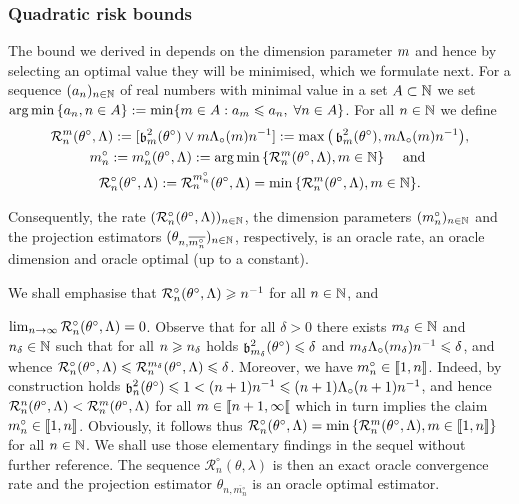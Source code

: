 \subsubsection{Quadratic risk bounds}
The bound we derived in  depends on the
dimension parameter $\Di$ and hence by selecting an optimal value they
will be minimised, which we formulate next.  For a sequence
$\Nsuite[n]{a_n}$ of real numbers with minimal value in a set
$A\subset{\Nz}$ we set
$\argmin\set{a_n,n\in A}:=\min\{m\in A:a_m\leq a_n,\;\forall n\in A
\}$. For all $n\in\Nz$ we define
\begin{multline*}
  \dRa{\Di}{\xdf,\Lambda}:=[\bias^2(\xdf)\vee\Di \oiSv \ssY^{-1}]
  :=\max\vectB{\bias^2(\xdf), \Di \oiSv \ssY^{-1}},\\
  \hfill
  \onDi:=\onDi(\xdf,\Lambda):=\argmin\Nset[{\Di\in\Nz}]{\dRa{\Di}{\xdf,\Lambda}}
  \quad\text{ and }\hfill\\
  \oRa{\xdf,\Lambda}:=\dRa{\onDi}{\xdf,\Lambda}=\min\Nset[{\Di\in\Nz}]{\dRa{\Di}{\xdf,\Lambda}}.
\end{multline*}

\begin{te}
Consequently, the  rate $\Nsuite[\ssY]{\oRa{\xdf,\Lambda}}$, the dimension parameters $\Nsuite[\ssY]{\onDi}$  and  the projection estimators  $\Nsuite[\ssY]{\txdfPr[\onDi]}$, respectively, is an oracle
rate, an oracle dimension and oracle optimal (up to a constant).
\end{te}

\begin{rmk}
We shall emphasise that $\oRa{\xdf,\Lambda}\geq \ssY^{-1}$ for all
  $\ssY\in\Nz$, and
  
  $\lim_{n \rightarrow \infty} \oRa{\xdf,\Lambda}=0$.
  Observe that for all $\delta>0$ there exists $\Di_{\delta}\in\Nz$ and
  $\ssY_\delta\in\Nz$ such that for all $\ssY\geq \ssY_{\delta}$ holds
  $\bias[\Di_\delta]^2(\xdf)\leq \delta$ and
  $\Di_{\delta} \oiSv[\Di_\delta] \ssY^{-1}\leq\delta$, and whence
  $\oRa{\xdf,\Lambda}\leq\dRa{\Di_\delta}{\xdf,\Lambda}\leq \delta$.
  Moreover, we have $\oDi{\ssY}\in\nset{1,\ssY}$. Indeed, by construction
  holds
  $\bias[\ssY]^2(\xdf)\leq 1<(\ssY+1)\ssY^{-1}\leq
  (\ssY+1)\oiSv[\ssY+1]{}\ssY^{-1}$, and hence
  $\dRa{\ssY}{\xdf,\Lambda}<\dRa{\Di}{\xdf,\Lambda}$ for all
  $\Di\in \nsetro{\ssY+1,\infty}$ which in turn implies the claim
  $\oDi{\ssY}\in\nset{1,\ssY}$. Obviously, it follows thus
  $\oRa{\xdf,\Lambda}=\min\set{ \dRa{\Di}{\xdf,\Lambda}
    ,\Di\in\nset{1,\ssY}}$ for all $\ssY\in\Nz$. We shall use those
  elementary findings in the sequel without further reference.
The sequence $\mathcal{R}_{n}^{\circ}(\theta, \lambda)$ is then an exact oracle convergence rate and the projection estimator $\theta_{n, \overline{m_{n}^{\circ}}}$ is an oracle optimal estimator.
\remEnd
\end{rmk}

